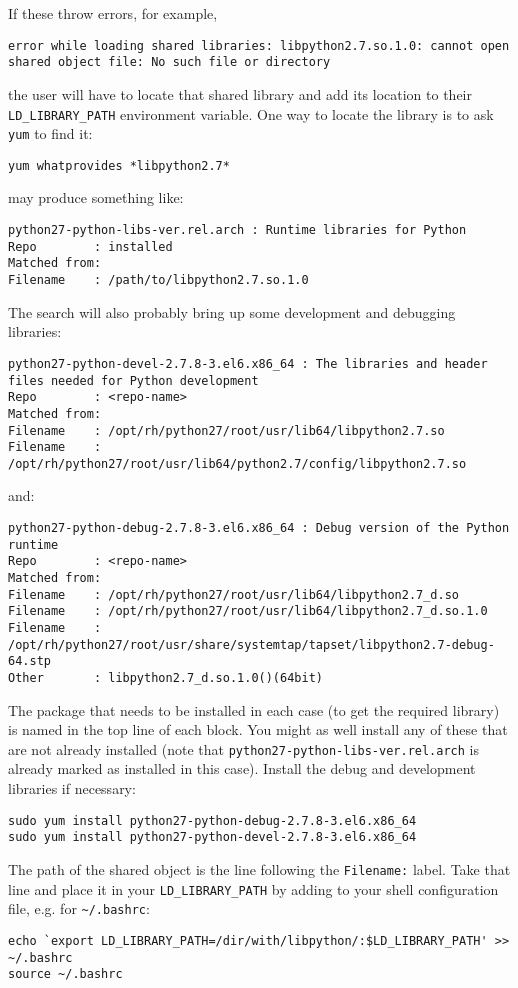 If these throw errors, for example,
\begin{lstlisting}
error while loading shared libraries: libpython2.7.so.1.0: cannot open shared object file: No such file or directory
\end{lstlisting}
the user will have to locate that shared library 
and add its location to their \verb|LD_LIBRARY_PATH| environment variable.
One way to locate the library is to ask \verb|yum| to find it:
\begin{lstlisting}
yum whatprovides *libpython2.7*
\end{lstlisting}
may produce something like:
\begin{lstlisting}
python27-python-libs-ver.rel.arch : Runtime libraries for Python
Repo        : installed
Matched from:
Filename    : /path/to/libpython2.7.so.1.0
\end{lstlisting}
The search will also probably bring up some development and debugging libraries:
\begin{lstlisting}
python27-python-devel-2.7.8-3.el6.x86_64 : The libraries and header files needed for Python development
Repo        : <repo-name> 
Matched from:
Filename    : /opt/rh/python27/root/usr/lib64/libpython2.7.so
Filename    : /opt/rh/python27/root/usr/lib64/python2.7/config/libpython2.7.so
\end{lstlisting}
and:
\begin{lstlisting}
python27-python-debug-2.7.8-3.el6.x86_64 : Debug version of the Python runtime
Repo        : <repo-name> 
Matched from:
Filename    : /opt/rh/python27/root/usr/lib64/libpython2.7_d.so
Filename    : /opt/rh/python27/root/usr/lib64/libpython2.7_d.so.1.0
Filename    : /opt/rh/python27/root/usr/share/systemtap/tapset/libpython2.7-debug-64.stp
Other       : libpython2.7_d.so.1.0()(64bit)
\end{lstlisting}
The package that needs to be installed in each case 
(to get the required library)
is named in the top line of each block.
You might as well install any of these
that are not already installed
(note that \verb|python27-python-libs-ver.rel.arch|
is already marked as installed in this case).
Install the debug and development libraries if necessary:
\begin{lstlisting}
sudo yum install python27-python-debug-2.7.8-3.el6.x86_64
sudo yum install python27-python-devel-2.7.8-3.el6.x86_64
\end{lstlisting}

The path of the shared object is the line following the \verb|Filename:| label.
Take that line and place it in your \verb|LD_LIBRARY_PATH| 
by adding to your shell configuration file, 
e.g. for \verb|~/.bashrc|:
\begin{lstlisting}
echo `export LD_LIBRARY_PATH=/dir/with/libpython/:$LD_LIBRARY_PATH' >> ~/.bashrc
source ~/.bashrc
\end{lstlisting}

